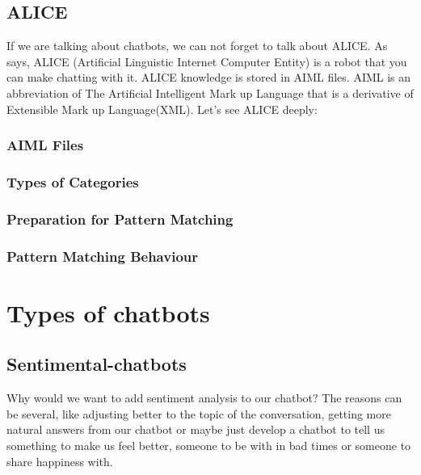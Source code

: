 \documentclass[12pt,twoside]{article}
\theoremstyle{plain}
\theoremstyle{definition}
\theoremstyle{remark}
\begin{document}
\subsection{ALICE}
	\label{sec:alice}
	
	If we are talking about chatbots, we can not forget to talk about ALICE. As \cite{shawar2002comparison} says, ALICE (Artificial Linguistic Internet Computer Entity) is a robot that you can make chatting with it. ALICE knowledge is stored in AIML files. AIML is an abbreviation of The Artificial Intelligent Mark up Language that is a derivative of Extensible Mark up Language(XML). Let's see ALICE deeply:
	
	\cite{wallace2003elements	}
	
\subsubsection{AIML Files}
	\label{sec:aiml}

\subsubsection{Types of Categories}
	\label{sec:categories}
	
\subsubsection{Preparation for Pattern Matching}
	\label{sec:preparation}	

\subsubsection{Pattern Matching Behaviour}
	\label{sec:match}




\section{Types of chatbots}
	\label{sec:types}
	



	\subsection{Sentimental-chatbots}
	\label{sec:sentimental}
	
	Why would we want to add sentiment analysis to our chatbot? The reasons can be several, like adjusting better to the topic of the conversation, getting more natural answers from our chatbot or maybe just develop a chatbot to tell us something to make us feel better, someone to be with in bad times or someone to share happiness with.
	
\end{document}
